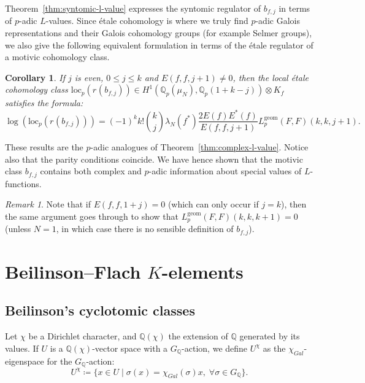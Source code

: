 \documentclass[11pt, a4paper, reqno]{amsart}
\theoremstyle{definition}
\theoremstyle{plain}
\newtheorem{corollary}[definition]{Corollary}
\theoremstyle{remark}
\newtheorem*{remark}{Remark}
\DeclareMathOperator{\et}{\acute{e}t}
\newcommand{\numberset}{\mathbb}
\newcommand{\Q}{\numberset{Q}}
\newcommand{\regulator}[1]{r_{#1}}
\newcommand{\ret}{\regulator{\et}}
\newcommand{\Lgeom}{L_p^{\mathrm{geom}}}
\renewcommand{\le}{\leqslant}
\renewcommand{\leq}{\le}
\begin{document}
Theorem~\ref{thm:syntomic-l-value} expresses the syntomic regulator of $b_{f, j}$ in terms of $p$-adic $L$-values. Since étale cohomology is where we truly find $p$-adic Galois representations and their Galois cohomology groups (for example Selmer groups), we also give the following equivalent formulation in terms of the étale regulator of a motivic cohomology class.
\begin{corollary}
    If $j$ is even, $0\leq j\leq k$ and $E(f,f,j+1)\neq 0$, then the local étale cohomology class $\mathrm{loc}_p(\ret(b_{f, j}))\in H^1(\Q_p(\mu_N),\Q_p(1+k-j))\otimes K_f$ satisfies the formula:
    \begin{equation}
        \label{eq:etale-l-value}
        \log(\mathrm{loc}_p(\ret(b_{f, j}))) = (-1)^k k!\binom{k}{j}\lambda_N(f^*)\frac{2E(f)E^*(f)}{E(f,f,j+1)}\Lgeom(F,F)(k,k,j+1).
    \end{equation}
\end{corollary}
These results are the $p$-adic analogues of Theorem~\ref{thm:complex-l-value}. Notice also that the parity conditions coincide. We have hence shown that the motivic class $b_{f, j}$ contains both complex and $p$-adic information about special values of $L$-functions.

\begin{remark}
 Note that if $E(f, f, 1 + j) = 0$ (which can only occur if $j = k$), then the same argument goes through to show that $L_p^{\mathrm{geom}}(F, F)(k, k, k + 1) = 0$ (unless $N = 1$, in which case there is no sensible definition of $b_{f, j}$).
\end{remark}

\section{Beilinson--Flach \texorpdfstring{$K$}{K}-elements}

 \subsection{Beilinson's cyclotomic classes}

  Let $\chi$ be a Dirichlet character, and $\Q(\chi)$ the extension of $\Q$ generated by its values. If $U$ is a $\Q(\chi)$-vector space with a $G_{\Q}$-action, we define $U^{\chi}$ as the $\chi_{Gal}$-eigenspace for the $G_{\Q}$-action:
  \begin{equation}
   \label{eq:chi-eigenspace}
   U^{\chi} \coloneqq \{ x\in U \mid \sigma(x) = \chi_{Gal}(\sigma) x, \; \forall \sigma\in G_{\Q} \}.
  \end{equation}
\end{document}
